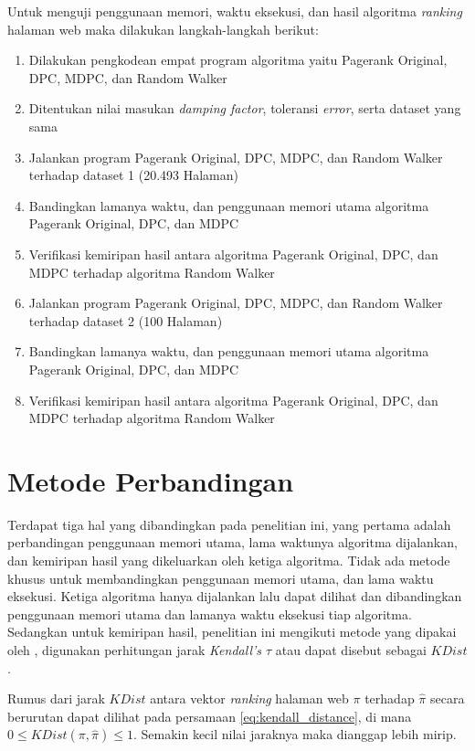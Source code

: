 Untuk menguji penggunaan memori, waktu eksekusi, dan hasil algoritma \textit{ranking} halaman web maka dilakukan langkah-langkah berikut:
\begin{enumerate}
	\item{Dilakukan pengkodean empat program algoritma yaitu Pagerank Original, DPC, MDPC, dan Random Walker}
	\item{Ditentukan nilai masukan \textit{damping factor}, toleransi \textit{error}, serta dataset yang sama}
	\item{Jalankan program Pagerank Original, DPC, MDPC, dan Random Walker terhadap dataset 1 (20.493 Halaman)}
	\item{Bandingkan lamanya waktu, dan penggunaan memori utama algoritma Pagerank Original, DPC, dan MDPC}
	\item{Verifikasi kemiripan hasil antara algoritma Pagerank Original, DPC, dan MDPC terhadap algoritma Random Walker}
	\item{Jalankan program Pagerank Original, DPC, MDPC, dan Random Walker terhadap dataset 2 (100 Halaman)}
	\item{Bandingkan lamanya waktu, dan penggunaan memori utama algoritma Pagerank Original, DPC, dan MDPC}
	\item{Verifikasi kemiripan hasil antara algoritma Pagerank Original, DPC, dan MDPC terhadap algoritma Random Walker}
\end{enumerate}

\section{Metode Perbandingan}

Terdapat tiga hal yang dibandingkan pada penelitian ini, yang pertama adalah perbandingan penggunaan memori utama, lama waktunya algoritma dijalankan, dan kemiripan hasil yang dikeluarkan oleh ketiga algoritma. Tidak ada metode khusus untuk membandingkan penggunaan memori utama, dan lama waktu eksekusi. Ketiga algoritma hanya dijalankan lalu dapat dilihat dan dibandingkan penggunaan memori utama dan lamanya waktu eksekusi tiap algoritma. Sedangkan untuk kemiripan hasil, penelitian ini mengikuti metode yang dipakai oleh \citet{zhuetal2005distributedPagerank}, digunakan perhitungan jarak \textit{Kendall's $\tau$} atau dapat disebut sebagai $KDist$.

Rumus dari jarak $KDist$ antara vektor \textit{ranking} halaman web $\pi$ terhadap $\hat{\pi}$ secara berurutan dapat dilihat pada persamaan \ref{eq:kendall_distance}, di mana $0 \leq KDist(\pi, \hat{\pi}) \leq 1$. Semakin kecil nilai jaraknya maka dianggap lebih mirip.

